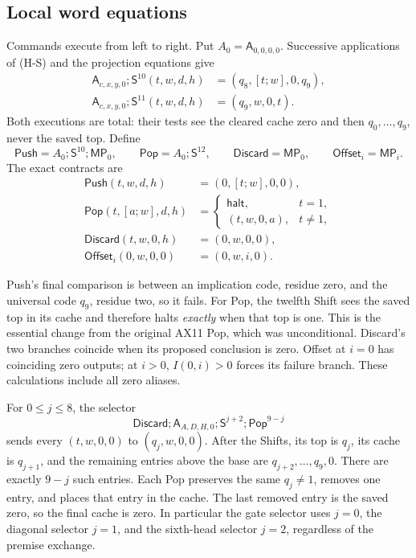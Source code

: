 \subsection{Local word equations}

Commands execute from left to right. Put $A_0=\mathsf A_{0,0,0,0}$.
Successive applications of (H-S) and the projection equations give
\begin{align*}
 \mathsf A_{c,x,y,0};\mathsf S^{10}(t,w,d,h)
    &=(q_8,[t;w],0,q_9),\\
 \mathsf A_{c,x,y,0};\mathsf S^{11}(t,w,d,h)
    &=(q_9,w,0,t).
\end{align*}
Both executions are total: their tests see the cleared cache zero and
then $q_0,\ldots,q_9$, never the saved top. Define
\[
 \mathsf{Push}=A_0;\mathsf S^{10};\mathsf{MP}_0,\qquad
 \mathsf{Pop}=A_0;\mathsf S^{12},\qquad
 \mathsf{Discard}=\mathsf{MP}_0,\qquad
 \mathsf{Offset}_i=\mathsf{MP}_i.
\]
The exact contracts are
\begin{align*}
 \mathsf{Push}(t,w,d,h)&=(0,[t;w],0,0),\\
 \mathsf{Pop}(t,[a;w],d,h)
   &=\begin{cases}
       \mathsf{halt},&t=1,\\
       (t,w,0,a),&t\ne1,
      \end{cases}\\
 \mathsf{Discard}(t,w,0,h)&=(0,w,0,0),\\
 \mathsf{Offset}_i(0,w,0,0)&=(0,w,i,0).
\end{align*}

Push's final comparison is between an implication code, residue zero,
and the universal code $q_9$, residue two, so it fails. For Pop, the
twelfth Shift sees the saved top in its cache and therefore halts
\emph{exactly} when that top is one. This is the essential change from
the original AX11 Pop, which was unconditional. Discard's two branches
coincide when its proposed conclusion is zero. Offset at $i=0$ has
coinciding zero outputs; at $i>0$, $I(0,i)>0$ forces its failure branch.
These calculations include all zero aliases.

For $0\le j\le8$, the selector
\[
 \mathsf{Discard};\mathsf A_{A,D,H,0};
                   \mathsf S^{j+2};\mathsf{Pop}^{9-j}       \tag{H-Sel}
\]
sends every $(t,w,0,0)$ to $(q_j,w,0,0)$. After the Shifts, its
top is $q_j$, its cache is $q_{j+1}$, and the remaining entries above
the base are $q_{j+2},\ldots,q_9,0$. There are exactly $9-j$ such
entries. Each Pop preserves the same $q_j\ne1$, removes one entry,
and places that entry in the cache. The last removed entry is the
saved zero, so the final cache is zero. In particular the gate
selector uses $j=0$, the diagonal selector $j=1$, and the sixth-head
selector $j=2$, regardless of the premise exchange.

